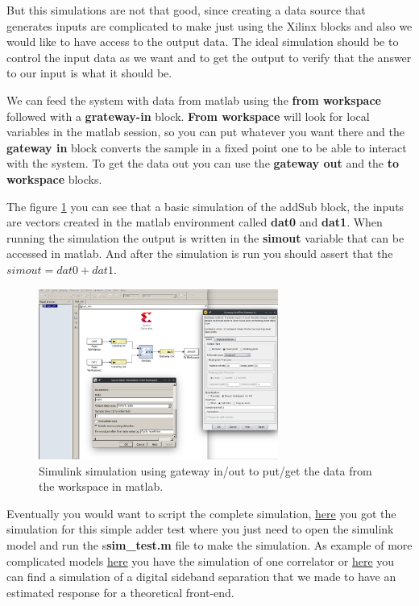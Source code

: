 But this simulations are not that good, since creating a data source that generates inputs are complicated to make just using the Xilinx blocks and also we would like to have access to the output data. The ideal simulation should be to control the input data as we want and to get the output to verify that the answer to our input is what it should be.

We can feed the system with data from matlab using the \textbf{from workspace} followed with a \textbf{grateway-in} block. \textbf{From workspace} will look for local variables in the matlab session, so you can put whatever you want there and the \textbf{gateway in} block converts the sample in a fixed point one to be able to interact with the system. To get the data out you can use the \textbf{gateway out} and the  \textbf{to workspace} blocks.


The figure \ref{fig:gateway_sim} you can see that a basic simulation of the addSub block, the inputs are vectors created in the matlab environment called \textbf{dat0} and \textbf{dat1}. When running the simulation the output is written in the \textbf{simout} variable that can be accessed in matlab.
And after the simulation is run you should assert that the $simout=dat0+dat1$.

\begin{figure}[h]
    \centering
    \includegraphics[width=0.7\textwidth]{images/sim_gateway_in.png}
    \caption{Simulink simulation using gateway in/out to put/get the data from the workspace in matlab.}
    \label{fig:gateway_sim}
\end{figure}

Eventually you would want to script the complete simulation, \href{https://github.com/sebajor/simulink_models/tree/master/Misc/Scripted_Simulation/simple_adder}{here} you got the simulation for this simple adder test where you just need to open the simulink model and run the s\textbf{sim\_test.m} file to make the simulation.
As example of more complicated models \href{https://github.com/sebajor/simulink_models/tree/master/Pocket_Correlators/simulation/wide_correlator_2in}{here} you have the simulation of one correlator or \href{https://github.com/sebajor/simulink_models/tree/master/Digital_Sideband_Separation/simulation}{here} you can find a simulation of a digital sideband separation that we made to have an estimated response for a theoretical front-end.


